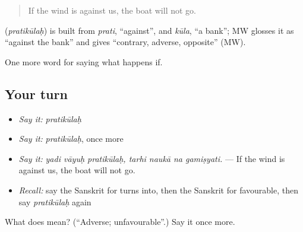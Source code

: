 \begin{quote}
If the wind is against us, the boat will not go.
\end{quote}

\begin{cousinweb}
\textbf{} (\emph{pratikūlaḥ}) is built from \emph{prati}, \textquotedblleft{}against\textquotedblright{}, and \emph{kūla}, \textquotedblleft{}a bank\textquotedblright{}; MW glosses it as \textquotedblleft{}against the bank\textquotedblright{} and gives \textquotedblleft{}contrary, adverse, opposite\textquotedblright{} (MW).
\end{cousinweb}

\begin{grammarlens}[title={What you've built}]
One more word for saying what happens if.
\end{grammarlens}

\subsection*{Your turn}
\begin{itemize}
\raggedright
  \item \emph{Say it:} \emph{pratikūlaḥ}
  \item \emph{Say it:} \emph{pratikūlaḥ}, once more
  \item \emph{Say it:} \emph{yadi vāyuḥ pratikūlaḥ, tarhi naukā na gamiṣyati.} — If the wind is against us, the boat will not go.
  \item \emph{Recall:} say the Sanskrit for turns into, then the Sanskrit for favourable, then say \emph{pratikūlaḥ} again
\end{itemize}

\begin{tcolorbox}[breakable,colback=teal!4,colframe=teal!35!black,title={Before you move on}]
What does  mean? (\textquotedblleft{}Adverse; unfavourable\textquotedblright{}.) Say it once more.
\end{tcolorbox}
